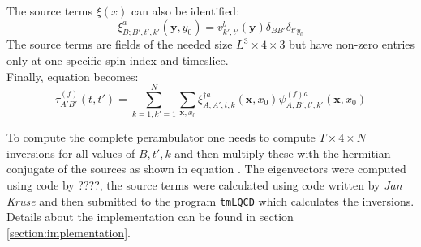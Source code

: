     The source terms $\xi(x)$ can also be identified:
    \begin{equation}
        \xi^a_{B;B',t',k'}(\textbf{y},y_0) =  v_{k',t'}^{b}(\textbf{y})\delta_{BB'}\delta_{t'y_0}
    \end{equation}
    The source terms are fields of the needed size $L^3 \times 4 \times 3$ but have non-zero entries only at one specific spin index and timeslice.\\
    
    Finally, equation  becomes:
    \begin{equation}\label{perambulator_with_inversion}
        \tau^{(f)}_{A'B'}(t,t') = \sum_{k=1,k'=1}^N \sum_{\textbf{x},x_0} \xi^{\dagger a}_{A;A',t,k}(\textbf{x},x_0) \psi^{(f)a}_{A;B',t',k'}(\textbf{x},x_0) 
    \end{equation}
    
    To compute the complete perambulator one needs to compute $T \times 4 \times N$ inversions for all values of $B,t',k$ and then multiply these with the hermitian conjugate of the sources as shown in equation . The eigenvectors were computed using code by ????, the source terms were calculated using code written by \textit{Jan Kruse} \cite{bachelor_thesis_jan} and then submitted to the program \verb+tmLQCD+ \cite{jansen_urbach_2009} which calculates the inversions. Details about the implementation can be found in section \ref{section:implementation}.
    